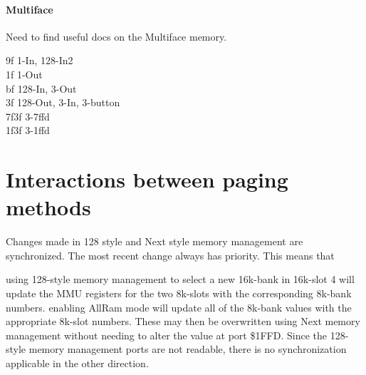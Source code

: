 \paragraph{Multiface}

Need to find useful docs on the Multiface memory.

9f 1-In, 128-In2\\
1f 1-Out\\
bf 128-In, 3-Out\\
3f 128-Out, 3-In, 3-button\\
7f3f 3-7ffd\\
1f3f 3-1ffd

\section{Interactions between paging methods}

Changes made in 128 style and Next style memory management are
synchronized. The most recent change always has priority. This means
that

using 128-style memory management to select a new 16k-bank in 16k-slot
4 will update the MMU registers for the two 8k-slots with the
corresponding 8k-bank numbers.  enabling AllRam mode will update all
of the 8k-bank values with the appropriate 8k-slot numbers. These may
then be overwritten using Next memory management without needing to
alter the value at port \$1FFD.  Since the 128-style memory management
ports are not readable, there is no synchronization applicable in the
other direction.
